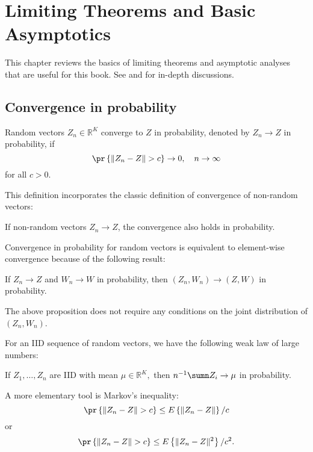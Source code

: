  
\chapter{Limiting Theorems and Basic Asymptotics}
\label{chapter::limiting-theorems} 


This chapter reviews the basics of limiting theorems and asymptotic analyses that are useful for this book. See \citet{newey1994large} and \citet{van2000asymptotic} for in-depth discussions. 

\section{Convergence in probability}



\begin{definition}
Random vectors $Z_{n}\in\mathbb{R}^{K}$ converge to $Z$ in probability,
denoted by $Z_{n}\rightarrow Z$ in probability, if 
\[
\pr\left\{ \|Z_{n}-Z\|>c\right\} \rightarrow0,\quad n\rightarrow\infty 
\]
for all $c>0$. 
\end{definition}


This definition incorporates the classic definition of convergence
of non-random vectors:
\begin{proposition}
If non-random vectors $Z_{n}\rightarrow Z$, the convergence also
holds in probability.
\end{proposition}
%
Convergence in probability for random vectors is equivalent to element-wise
convergence because of the following result:
\begin{proposition}
If $Z_{n}\rightarrow Z$ and $W_{n}\rightarrow W$ in probability,
then $(Z_{n},W_{n})\rightarrow(Z,W)$ in probability. 
\end{proposition}


The above proposition does not require any conditions on the joint distribution of $(Z_n, W_n)$. 


For an IID sequence of random vectors, we have the following weak law of
large numbers:
\begin{proposition}
If $Z_{1},\ldots,Z_{n}$ are \textup{IID} with mean $\mu\in\mathbb{R}^{K},$
then $  n^{-1}\sumn Z_{i}\rightarrow\mu$ in probability. 
\end{proposition}

A more elementary tool is Markov's inequality:
\begin{equation}
\pr\left\{ \|Z_{n}-Z\|>c\right\} \leq E\left\{ \|Z_{n}-Z\|\right\} /c\label{eq:1stmoment}
\end{equation}
or 
\begin{equation}
\pr\left\{ \|Z_{n}-Z\|>c\right\} \leq E\left\{ \|Z_{n}-Z\|^{2}\right\} /c^{2}.\label{eq:2ndmoment}
\end{equation}


